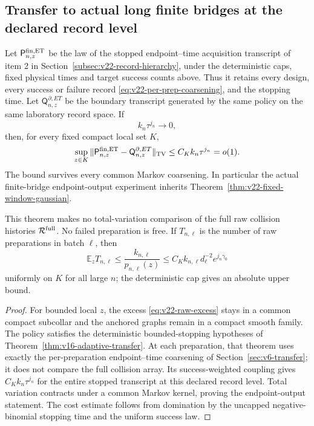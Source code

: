 \subsection{Transfer to actual long finite bridges at the declared record level}

\begin{theorem}
\label{thm:v22-stopped-local-transfer}
Let $\mathsf P_{n,z}^{\rm fin,ET}$ be the law of the stopped
endpoint--time acquisition transcript of item 2 in
Section~\ref{subsec:v22-record-hierarchy}, under the deterministic caps,
fixed physical times and target success counts above.  Thus it retains every
design, every success or failure record
\eqref{eq:v22-per-prep-coarsening}, and the stopping time.  Let
$\mathsf Q_{n,z}^{\partial,ET}$ be the boundary transcript generated by the
same policy on the same laboratory record space.  If
\begin{equation}\label{eq:v22-transfer-condition}
                         k_n\tau^{j_n}\longrightarrow0,
\end{equation}
then, for every fixed compact local set $K$,
\begin{equation}\label{eq:v22-lecam-transfer}
 \sup_{z\in K}
 \|\mathsf P_{n,z}^{\rm fin,ET}-
   \mathsf Q_{n,z}^{\partial,ET}\|_{\rm TV}
 \le C_Kk_n\tau^{j_n}=o(1).
\end{equation}
The bound survives every common Markov coarsening.  In particular the actual
finite-bridge endpoint-output experiment inherits
Theorem~\ref{thm:v22-fixed-window-gaussian}.

This theorem makes no total-variation comparison of the full raw collision
histories $\mathcal R^{\rm full}$.  No failed preparation is free.  If
$T_{n,\ell}$ is the number of raw preparations in batch $\ell$, then
\begin{equation}\label{eq:v22-physical-cost}
 \mathbb E_zT_{n,\ell}
 \le \frac{k_{n,\ell}}{p_{n,\ell}(z)}
 \le C_Kk_{n,\ell}d_\ell^{-2}e^{j_n\gamma_0}
\end{equation}
uniformly on $K$ for all large $n$; the deterministic cap gives an absolute
upper bound.
\end{theorem}

\begin{proof}
For bounded local $z$, the excess \eqref{eq:v22-raw-excess} stays in a common
compact subcollar and the anchored graphs remain in a compact smooth family.
The policy satisfies the deterministic bounded-stopping hypotheses of
Theorem~\ref{thm:v16-adaptive-transfer}.  At each preparation, that theorem
uses exactly the per-preparation endpoint--time coarsening of
Section~\ref{sec:v6-transfer}; it does not compare the full collision array.
Its success-weighted coupling gives
$C_Kk_n\tau^{j_n}$ for the entire stopped transcript at this declared record
level.  Total variation contracts under a common Markov kernel, proving the
endpoint-output statement.  The cost estimate follows from domination by the
uncapped negative-binomial stopping time and the uniform success law.
\end{proof}

